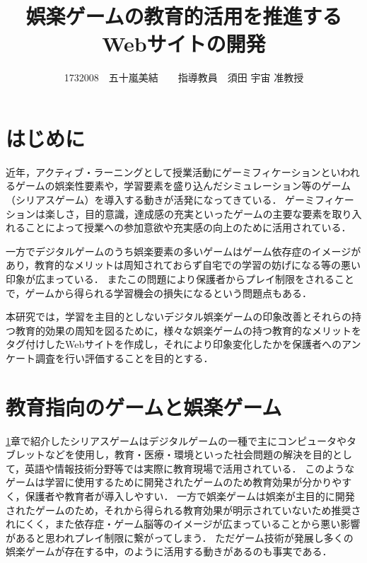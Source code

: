 \documentclass[twocolumn,10pt,a4j]{ltjsarticle}
\title{娯楽ゲームの教育的活用を推進するWebサイトの開発}
\author{1732008　五十嵐美結　　指導教員　須田 宇宙 准教授}
\date{}
\begin{document}
\maketitle

\section{はじめに}\label{introduction}

近年，アクティブ・ラーニングとして授業活動にゲーミフィケーションといわれるゲームの娯楽性要素や，学習要素を盛り込んだシミュレーション等のゲーム（シリアスゲーム）を導入する動きが活発になってきている．
ゲーミフィケーションは楽しさ，目的意識，達成感の充実といったゲームの主要な要素を取り入れることによって授業への参加意欲や充実感の向上のために活用されている．


一方でデジタルゲームのうち娯楽要素の多いゲームはゲーム依存症のイメージがあり，教育的なメリットは周知されておらず自宅での学習の妨げになる等の悪い印象が広まっている．
またこの問題により保護者からプレイ制限をされることで，ゲームから得られる学習機会の損失になるという問題点もある．

本研究では，学習を主目的としないデジタル娯楽ゲームの印象改善とそれらの持つ教育的効果の周知を図るために，様々な娯楽ゲームの持つ教育的なメリットをタグ付けしたWebサイトを作成し，それにより印象変化したかを保護者へのアンケート調査を行い評価することを目的とする．

\section{教育指向のゲームと娯楽ゲーム}

\ref{introduction}章で紹介したシリアスゲームはデジタルゲームの一種で主にコンピュータやタブレットなどを使用し，教育・医療・環境といった社会問題の解決を目的として，英語や情報技術分野等では実際に教育現場で活用されている．
このようなゲームは学習に使用するために開発されたゲームのため教育効果が分かりやすく，保護者や教育者が導入しやすい．
一方で娯楽ゲームは娯楽が主目的に開発されたゲームのため，それから得られる教育効果が明示されていないため推奨されにくく，また依存症・ゲーム脳等のイメージが広まっていることから悪い影響があると思われプレイ制限に繋がってしまう．
ただゲーム技術が発展し多くの娯楽ゲームが存在する中，\cite{tvgame}のように活用する動きがあるのも事実である．
\end{document}
